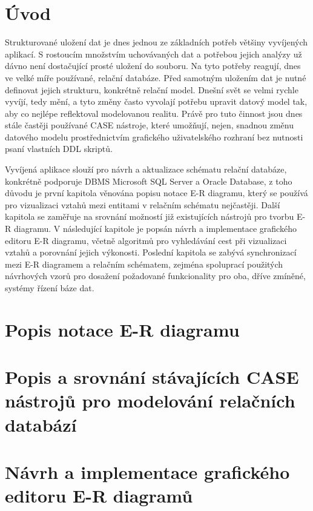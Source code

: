 \documentclass[czech,bachelor,public,dept460,male,oneside]{diploma}
\begin{document}
\MakeTitlePages

\lstlistoflistings

\section{Úvod}
Strukturované uložení dat je dnes jednou ze základních potřeb většiny vyvíjených aplikací. S rostoucím množstvím uchovávaných dat a potřebou jejich analýzy už dávno není dostačující prosté uložení do souboru. Na tyto potřeby reagují, dnes ve velké míře používané, relační databáze. Před samotným uložením dat je nutné definovat jejich strukturu, konkrétně relační model. Dnešní svět se velmi rychle vyvíjí, tedy mění, a tyto změny často vyvolají potřebu upravit datový model tak, aby co nejlépe reflektoval modelovanou realitu. Právě pro tuto činnost jsou dnes stále častěji používané CASE nástroje, které umožňují, nejen, snadnou změnu datového modelu prostřednictvím grafického uživatelského rozhraní bez nutnosti psaní vlastních DDL skriptů.

Vyvíjená aplikace slouží pro návrh a aktualizace schématu relační databáze, konkrétně podporuje DBMS Microsoft SQL Server a Oracle Database, z toho důvodu je první kapitola věnována popisu notace E-R diagramu, který se používá pro vizualizaci vztahů mezi entitami v relačním schématu nejčastěji. Další kapitola se zaměřuje na srovnání možností již existujících nástrojů pro tvorbu E-R diagramu. V následující kapitole je popsán návrh a implementace grafického editoru E-R diagramu, včetně algoritmů pro vyhledávání cest při vizualizaci vztahů a porovnání jejich výkonosti. Poslední kapitola se zabývá synchronizací mezi E-R diagramem a relačním schématem, zejména spoluprací použitých návrhových vzorů pro dosažení požadované funkcionality pro oba, dříve zmíněné, systémy řízení báze dat.

\section{Popis notace E-R diagramu}

\section{Popis a srovnání stávajících CASE nástrojů pro modelování relačních databází}

\section{Návrh a implementace grafického editoru E-R diagramů}
\end{document}
